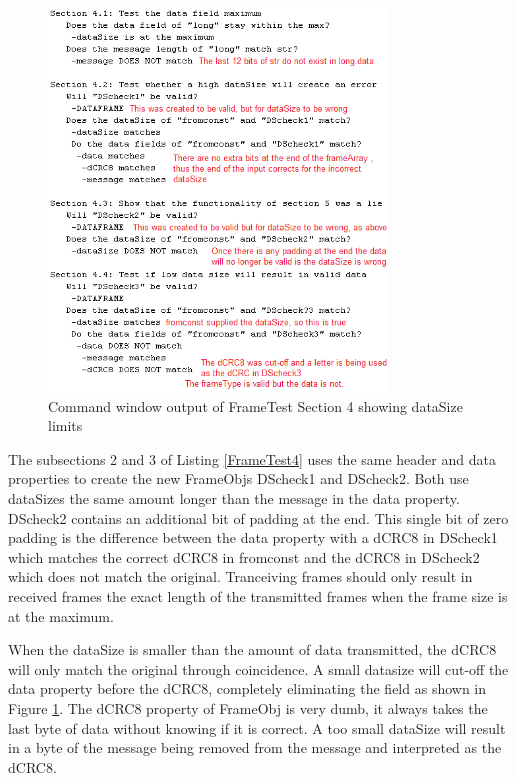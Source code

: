 \begin{figure}[ht]
    \includegraphics[width=0.8\textwidth]{FrameTest4.PNG}
    \caption{Command window output of FrameTest Section 4 showing dataSize limits  }
    \label{fig:FrameTest4}
\end{figure}

The subsections 2 and 3 of Listing \ref{FrameTest4} uses the same header and data properties to create the new FrameObjs DScheck1 and DScheck2. Both use dataSizes the same amount longer than the message in the data property. DScheck2 contains an additional bit of padding at the end. This single bit of zero padding is the difference between the data property with a dCRC8 in DScheck1 which matches the correct dCRC8 in fromconst and the dCRC8 in DScheck2 which does not match the original. Tranceiving frames should only result in received frames the exact length of the transmitted frames when the frame size is at the maximum.

When the dataSize is smaller than the amount of data transmitted, the dCRC8 will only match the original through coincidence. A small datasize will cut-off the data property before the dCRC8, completely eliminating the field as shown in Figure \ref{fig:FrameTest4}. The dCRC8 property of FrameObj is very dumb, it always takes the last byte of data without knowing if it is correct. A too small dataSize will result in a byte of the message being removed from the message and interpreted as the dCRC8. 

